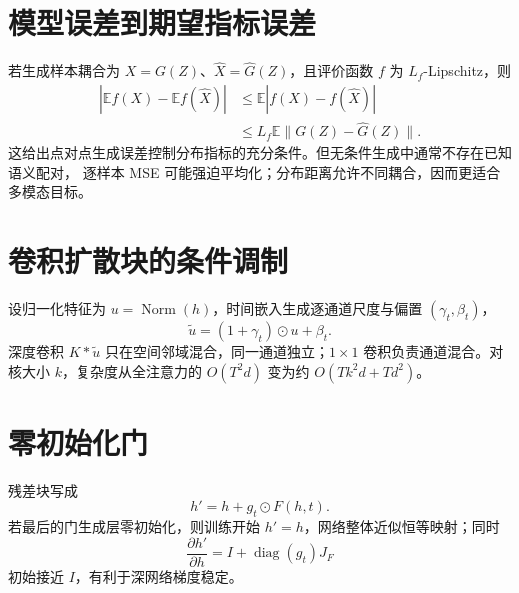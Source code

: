 \documentclass[11pt]{article}
\numberwithin{equation}{section}
\newcommand{\E}{\mathbb{E}}
\newcommand{\1}{\mathbf{1}}
\newcommand{\diag}{\operatorname{diag}}
\begin{document}
\section{模型误差到期望指标误差}

若生成样本耦合为 $X=G(Z)$、$\widehat X=\widehat G(Z)$，且评价函数
$f$ 为 $L_f$-Lipschitz，则
\begin{align}
 |\E f(X)-\E f(\widehat X)|
 &\le\E|f(X)-f(\widehat X)|\\
 &\le L_f\E\|G(Z)-\widehat G(Z)\|.
\end{align}
这给出点对点生成误差控制分布指标的充分条件。但无条件生成中通常不存在已知语义配对，
逐样本 MSE 可能强迫平均化；分布距离允许不同耦合，因而更适合多模态目标。

\section{卷积扩散块的条件调制}
设归一化特征为 $u=\operatorname{Norm}(h)$，时间嵌入生成逐通道尺度与偏置 $(\gamma_t,\beta_t)$，
\begin{equation}
  \tilde u=(1+\gamma_t)\odot u+\beta_t.
\end{equation}
深度卷积 $K*\tilde u$ 只在空间邻域混合，同一通道独立；$1\times1$ 卷积负责通道混合。对核大小 $k$，复杂度从全注意力的 $O(T^2d)$ 变为约 $O(Tk^2d+Td^2)$。

\section{零初始化门}
残差块写成
\begin{equation}
  h'=h+g_t\odot F(h,t).
\end{equation}
若最后的门生成层零初始化，则训练开始 $h'=h$，网络整体近似恒等映射；同时
\begin{equation}
  \frac{\partial h'}{\partial h}=I+\diag(g_t)J_F
\end{equation}
初始接近 $I$，有利于深网络梯度稳定。
\end{document}
